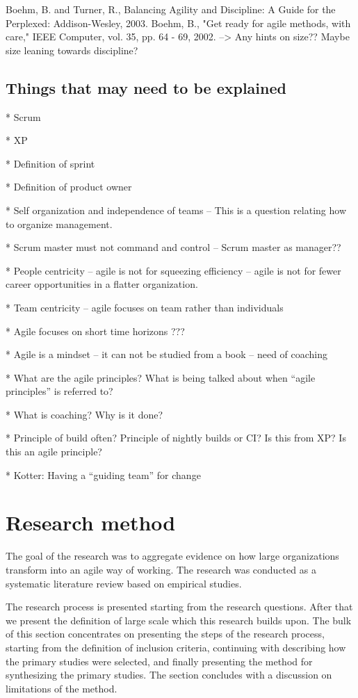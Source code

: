 \documentclass[preprint,authoryear,12pt]{elsarticle}
\begin{document}
Boehm, B. and Turner, R., Balancing Agility and Discipline: A Guide for the
Perplexed: Addison-Wesley, 2003.
Boehm, B., "Get ready for agile methods, with care," IEEE Computer, vol. 35,
pp. 64 - 69, 2002.
--> Any hints on size?? Maybe size leaning towards discipline?

\subsection{Things that may need to be explained}

* Scrum

* XP

* Definition of sprint

* Definition of product owner

* Self organization and independence of teams -- This is a question relating how
  to organize management. 

* Scrum master must not command and control -- Scrum master as manager??

* People centricity -- agile is not for squeezing efficiency -- agile is not for
  fewer career opportunities in a flatter organization.

* Team centricity -- agile focuses on team rather than individuals

* Agile focuses on short time horizons ???

* Agile is a mindset -- it can not be studied from a book -- need of coaching

* What are the agile principles? What is being talked about when ``agile
  principles'' is referred to?

* What is coaching? Why is it done?

* Principle of build often? Principle of nightly builds or CI? Is this from XP?
  Is this an agile principle?

* Kotter: Having a ``guiding team'' for change


\section{Research method}
\label{sec:method}

The goal of the research was to aggregate evidence on how large organizations
transform into an agile way of working. The research was conducted as a
systematic literature review based on empirical studies.

The research process is presented starting from the research questions. After
that we present the definition of large scale which this research builds upon.
The bulk of this section concentrates on presenting the steps of the research
process, starting from the definition of inclusion criteria, continuing with
describing how the primary studies were selected, and finally presenting the
method for synthesizing the primary studies. The section concludes with a
discussion on limitations of the method.
\end{document}
